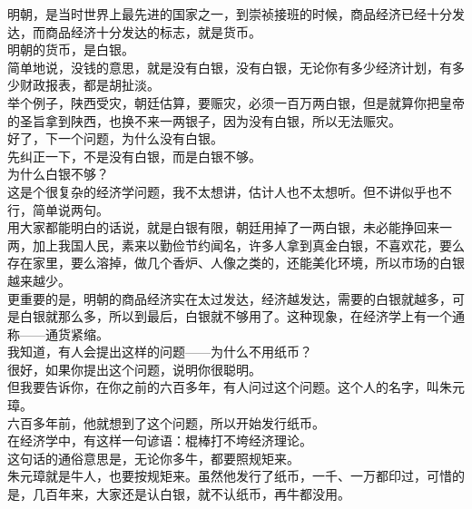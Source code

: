 \begin{multicols}{\theparacolNo}
明朝，是当时世界上最先进的国家之一，到崇祯接班的时候，商品经济已经十分发达，而商品经济十分发达的标志，就是货币。\\

明朝的货币，是白银。\\

简单地说，没钱的意思，就是没有白银，没有白银，无论你有多少经济计划，有多少财政报表，都是胡扯淡。\\

举个例子，陕西受灾，朝廷估算，要赈灾，必须一百万两白银，但是就算你把皇帝的圣旨拿到陕西，也换不来一两银子，因为没有白银，所以无法赈灾。\\

好了，下一个问题，为什么没有白银。\\

先纠正一下，不是没有白银，而是白银不够。\\

为什么白银不够？\\

这是个很复杂的经济学问题，我不太想讲，估计人也不太想听。但不讲似乎也不行，简单说两句。\\

用大家都能明白的话说，就是白银有限，朝廷用掉了一两白银，未必能挣回来一两，加上我国人民，素来以勤俭节约闻名，许多人拿到真金白银，不喜欢花，要么存在家里，要么溶掉，做几个香炉、人像之类的，还能美化环境，所以市场的白银越来越少。\\

更重要的是，明朝的商品经济实在太过发达，经济越发达，需要的白银就越多，可是白银就那么多，所以到最后，白银就不够用了。这种现象，在经济学上有一个通称——通货紧缩。\\

我知道，有人会提出这样的问题——为什么不用纸币？\\

很好，如果你提出这个问题，说明你很聪明。\\

但我要告诉你，在你之前的六百多年，有人问过这个问题。这个人的名字，叫朱元璋。\\

六百多年前，他就想到了这个问题，所以开始发行纸币。\\

在经济学中，有这样一句谚语：棍棒打不垮经济理论。\\

这句话的通俗意思是，无论你多牛，都要照规矩来。\\

朱元璋就是牛人，也要按规矩来。虽然他发行了纸币，一千、一万都印过，可惜的是，几百年来，大家还是认白银，就不认纸币，再牛都没用。\\


\end{multicols}
